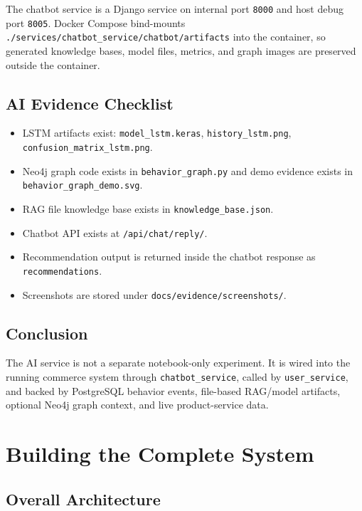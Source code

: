 \documentclass[12pt,a4paper]{article}
\newcommand{\codepath}[1]{{\small\texttt{#1}}}
\begin{document}
The chatbot service is a Django service on internal port \codepath{8000} and host debug port \codepath{8005}. Docker Compose bind-mounts \codepath{./services/chatbot\_service/chatbot/artifacts} into the container, so generated knowledge bases, model files, metrics, and graph images are preserved outside the container.

\subsection{AI Evidence Checklist}

\begin{itemize}
    \item LSTM artifacts exist: \codepath{model\_lstm.keras}, \codepath{history\_lstm.png}, \codepath{confusion\_matrix\_lstm.png}.
    \item Neo4j graph code exists in \codepath{behavior\_graph.py} and demo evidence exists in \codepath{behavior\_graph\_demo.svg}.
    \item RAG file knowledge base exists in \codepath{knowledge\_base.json}.
    \item Chatbot API exists at \codepath{/api/chat/reply/}.
    \item Recommendation output is returned inside the chatbot response as \codepath{recommendations}.
    \item Screenshots are stored under \codepath{docs/evidence/screenshots/}.
\end{itemize}

\subsection{Conclusion}

The AI service is not a separate notebook-only experiment. It is wired into the running commerce system through \codepath{chatbot\_service}, called by \codepath{user\_service}, and backed by PostgreSQL behavior events, file-based RAG/model artifacts, optional Neo4j graph context, and live product-service data.

\section{Building the Complete System}

\subsection{Overall Architecture}
\end{document}
